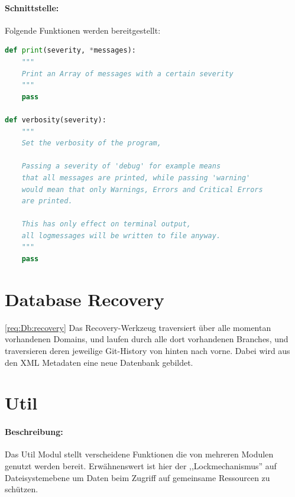 \paragraph{Schnittstelle:}
\label{par:schnittstelle_}

Folgende Funktionen werden bereitgestellt:
\begin{lstlisting}[language=python]
def print(severity, *messages):
    """
    Print an Array of messages with a certain severity
    """
    pass

def verbosity(severity):
    """
    Set the verbosity of the program, 

    Passing a severity of 'debug' for example means
    that all messages are printed, while passing 'warning'
    would mean that only Warnings, Errors and Critical Errors 
    are printed.

    This has only effect on terminal output,
    all logmessages will be written to file anyway.
    """
    pass
\end{lstlisting}

\section{Database Recovery} 
\label{sec:database_recovery}
\ref{req:Db:recovery}
Das Recovery-Werkzeug traversiert über alle momentan vorhandenen Domains, und laufen durch alle dort vorhandenen Branches, und traversieren deren 
jeweilige Git-History von hinten nach vorne.
Dabei wird aus den XML Metadaten eine neue Datenbank gebildet.

\section{Util} 
\label{sec:util}
\paragraph{Beschreibung:}
\label{par:beschreibung_}
Das Util Modul stellt verscheidene Funktionen die von mehreren Modulen genutzt werden bereit.
Erwähnenswert ist hier der ,,Lockmechanismus''
auf Dateisystemebene um Daten beim Zugriff auf gemeinsame  Ressourcen zu schützen.

